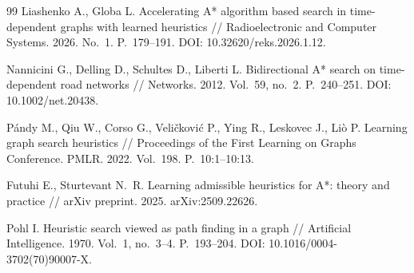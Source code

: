 \documentclass{misisarticle}
\begin{document}
\begin{thebibliography}{99}
 Liashenko A., Globa L. Accelerating A* algorithm based search in time-dependent graphs with learned heuristics // Radioelectronic and Computer Systems. 2026. No.~1. P.~179--191. DOI: 10.32620/reks.2026.1.12.

 Nannicini G., Delling D., Schultes D., Liberti L. Bidirectional A* search on time-dependent road networks // Networks. 2012. Vol.~59, no.~2. P.~240--251. DOI: 10.1002/net.20438.

 Pándy M., Qiu W., Corso G., Veličković P., Ying R., Leskovec J., Liò P. Learning graph search heuristics // Proceedings of the First Learning on Graphs Conference. PMLR. 2022. Vol.~198. P.~10:1--10:13.

 Futuhi E., Sturtevant N.~R. Learning admissible heuristics for A*: theory and practice // arXiv preprint. 2025. arXiv:2509.22626.

 Pohl I. Heuristic search viewed as path finding in a graph // Artificial Intelligence. 1970. Vol.~1, no.~3--4. P.~193--204. DOI: 10.1016/0004-3702(70)90007-X.

\end{thebibliography}
\end{document}
